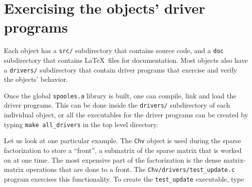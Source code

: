 \par
\section{Exercising the objects' driver programs}
\par
Each object has a {\tt src/} subdirectory that contains source code,
and a {\tt doc} subdirectory that contains \LaTeX\ files for
documentation.
Most objects also have a {\tt drivers/} subdirectory that contain
driver programs that exercise and verify the objects' behavior.
\par
Once the global {\tt spooles.a} library is built, one can compile,
link and load the driver programs.
This can be done inside the {\tt drivers/} subdirectory of each
individual object, or all the executables for the driver programs 
can be created by typing {\tt make all\_drivers} in the top level 
directory.
\par
Let us look at one particular example.
The {\tt Chv} object is used during the sparse factorization to
store a ``front'', a submatrix of the sparse matrix that is worked
on at one time.
The most expensive part of the factorization is the dense
matrix-matrix operations that are done to a front.
The {\tt Chv/drivers/test\_update.c} program exercises this
functionality.
To create the {\tt test\_update} executable, type 
